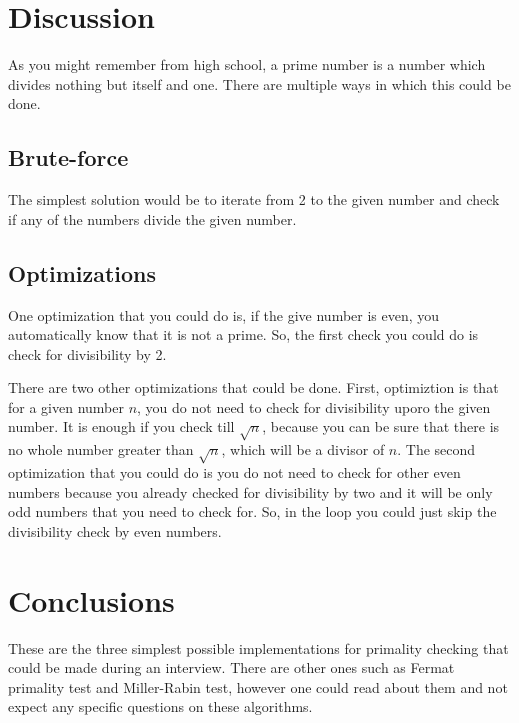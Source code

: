 \section{Discussion}
\label{primality_test:sec:discussion}
As you might remember from high school, a prime number is a number which divides nothing but itself and one. There are multiple ways in which this could be done.

\subsection{Brute-force}
\label{primality_test:sec:bruteforce}

The simplest solution would be to iterate from 2 to the given number and check if any of the numbers divide the given number. 


\subsection{Optimizations}

One optimization that you could do is, if the give number is even, you automatically know that it is not a prime. So, the first check you could do is check for divisibility by 2.



There are two other optimizations that could be done. First, optimiztion is that for a given
number $n$, you do not need to check for divisibility uporo the given number. It is enough if you check till $\sqrt{n}$, because you can be sure that there is no whole number greater than $\sqrt{n}$, which will be a divisor of $n$. The second optimization that you could do is you do not need to check for other even numbers because you already checked for divisibility by two and it will be only odd numbers that you need to check for. So, in the
loop you could just skip the divisibility check by even numbers.



\section{Conclusions}
These are the three simplest possible implementations for primality checking that could be made during an interview. There are other ones such as Fermat primality test and Miller-Rabin test, however one could read about them and not expect any specific questions
on these algorithms.
